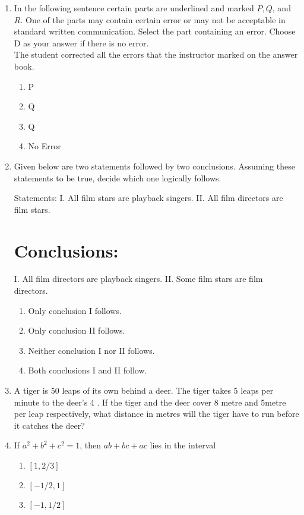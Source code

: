 \documentclass[journal]{IEEEtran}
\begin{document}
\begin{enumerate}
\item In the following sentence certain parts are underlined and marked $P, Q$, and $R$. One of the parts may contain certain error or may not be acceptable in standard written communication. Select the part containing an error. Choose D as your answer if there is no error.\\
The student corrected all the errors that the instructor marked on the answer book.
   \begin{multicols}{4}
			\begin{enumerate}
   \item P
\item  Q
\item Q
\item  No Error
\end{enumerate}
		\end{multicols}
  \item  Given below are two statements followed by two conclusions. Assuming these statements to be true, decide which one logically follows.

Statements:
I. All film stars are playback singers.
II. All film directors are film stars.

\section*{Conclusions:}
I. All film directors are playback singers.
II. Some film stars are film directors.
\begin{enumerate}
    
\item  Only conclusion I follows.
  \item  Only conclusion II follows.
\item  Neither conclusion I nor II follows.
 \item  Both conclusions I and II follow.
\end{enumerate}

  \item   A tiger is 50 leaps of its own behind a deer. The tiger takes 5 leaps per minute to the deer's 4 . If the tiger and the deer cover 8 metre and 5metre per leap respectively, what distance in metres will the tiger have to run before it catches the deer?
 \item If $a^{2}+b^{2}+c^{2}=1$, then $a b+b c+a c$ lies in the interval
  \begin{multicols}{4}
      
  
  \begin{enumerate}
    \item $[1,2 / 3]$
    \item $[-1 / 2,1]$
    \item  $[-1,1 / 2]$
  \end{enumerate}
  \end{multicols}
  

\end{enumerate}
\end{document}
